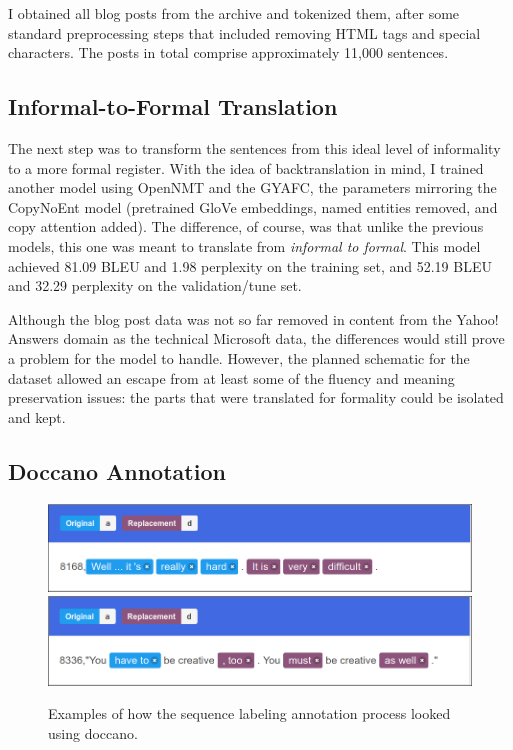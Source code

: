 I obtained all blog posts from the archive and tokenized them, after some standard preprocessing steps that included removing HTML tags and special characters. The posts in total comprise approximately 11,000 sentences. 

\subsection{Informal-to-Formal Translation}

The next step was to transform the sentences from this ideal level of informality to a more formal register. With the idea of backtranslation in mind, I trained another model using OpenNMT and the GYAFC, the parameters mirroring the CopyNoEnt model (pretrained GloVe embeddings, named entities removed, and copy attention added). The difference, of course, was that unlike the previous models, this one was meant to translate from \textit{informal to formal}. This model achieved 81.09 BLEU and 1.98 perplexity on the training set, and 52.19 BLEU and 32.29 perplexity on the validation/tune set.

Although the blog post data was not so far removed in content from the Yahoo! Answers domain as the technical Microsoft data, the differences would still prove a problem for the model to handle. However, the planned schematic for the dataset allowed an escape from at least some of the fluency and meaning preservation issues: the parts that were translated for formality could be isolated and kept.

\subsection{Doccano Annotation}

\begin{figure}
    \centering
    \includegraphics[width=\textwidth]{Figures/doccano.png}
    \includegraphics[width=\textwidth]{Figures/doccano2.png}
    \caption{Examples of how the sequence labeling annotation process looked using doccano.}
    \label{fig:doccano-ex}
\end{figure}

